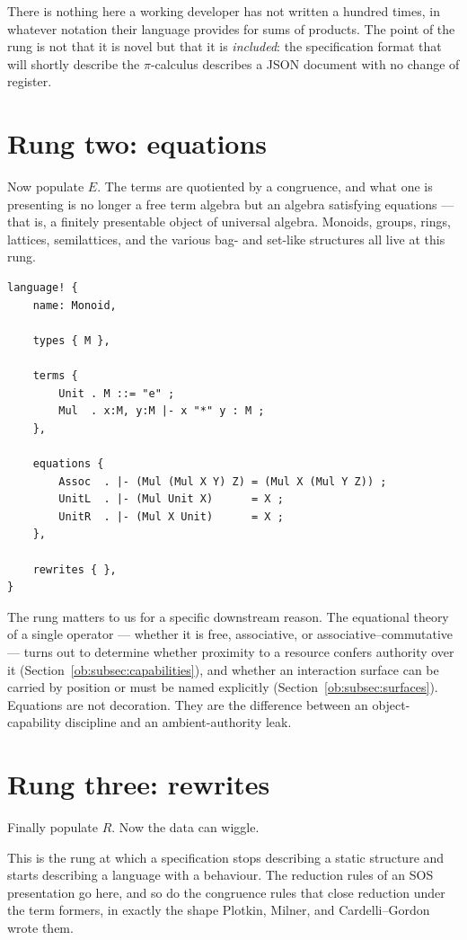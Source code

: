 There is nothing here a working developer has not written a hundred times, in whatever
notation their language provides for sums of products. The point of the rung is not
that it is novel but that it is \emph{included}: the specification format that will
shortly describe the $\pi$-calculus describes a JSON document with no change of
register.

\section{Rung two: equations}

Now populate $E$. The terms are quotiented by a congruence, and what one is presenting
is no longer a free term algebra but an algebra satisfying equations --- that is, a
finitely presentable object of universal algebra. Monoids, groups, rings, lattices,
semilattices, and the various bag- and set-like structures all live at this rung.

\begin{lstlisting}
language! {
    name: Monoid,

    types { M },

    terms {
        Unit . M ::= "e" ;
        Mul  . x:M, y:M |- x "*" y : M ;
    },

    equations {
        Assoc  . |- (Mul (Mul X Y) Z) = (Mul X (Mul Y Z)) ;
        UnitL  . |- (Mul Unit X)      = X ;
        UnitR  . |- (Mul X Unit)      = X ;
    },

    rewrites { },
}
\end{lstlisting}

The rung matters to us for a specific downstream reason. The equational theory of a
single operator --- whether it is free, associative, or associative--commutative ---
turns out to determine whether proximity to a resource confers authority over it
(Section~\ref{ob:subsec:capabilities}), and whether an interaction surface can be carried
by position or must be named explicitly (Section~\ref{ob:subsec:surfaces}). Equations are
not decoration. They are the difference between an object-capability discipline and an
ambient-authority leak.

\section{Rung three: rewrites}

Finally populate $R$. Now the data can wiggle.

This is the rung at which a specification stops describing a static structure and
starts describing a language with a behaviour. The reduction rules of an SOS
presentation go here, and so do the congruence rules that close reduction under the
term formers, in exactly the shape Plotkin, Milner, and Cardelli--Gordon wrote them.

